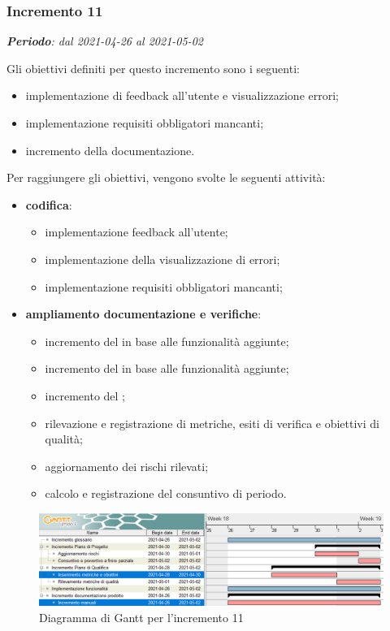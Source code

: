 \subsubsection{Incremento 11}
\textit{\textbf{Periodo}: dal 2021-04-26 al 2021-05-02}

Gli obiettivi definiti per questo incremento sono i seguenti:
\begin{itemize}
\item implementazione di feedback all'utente e visualizzazione errori;
\item implementazione requisiti obbligatori mancanti;
\item incremento della documentazione.
\end{itemize}

Per raggiungere gli obiettivi, vengono svolte le seguenti attività:
\begin{itemize}
\item \textbf{codifica}: 
\begin{itemize}
\item implementazione feedback all'utente;
\item implementazione della visualizzazione di errori;
\item implementazione requisiti obbligatori mancanti; 
\end{itemize} 

\item \textbf{ampliamento documentazione e verifiche}:
\begin{itemize}

\item incremento del  in base alle funzionalità aggiunte;
\item incremento del  in base alle funzionalità aggiunte;
\item incremento del ;
\item rilevazione e registrazione di metriche, esiti di verifica e obiettivi di qualità;
\item aggiornamento dei rischi rilevati;
\item calcolo e registrazione del consuntivo di periodo.
\end{itemize}

\end{itemize}
\begin{figure}[H]
\centering

\centerline{\includegraphics[scale=0.6]{res/Pianificazione/Fasi/VerificaIncrementi/ganttIncremento11}}
\caption{Diagramma di Gantt per l'incremento 11}
\end{figure}